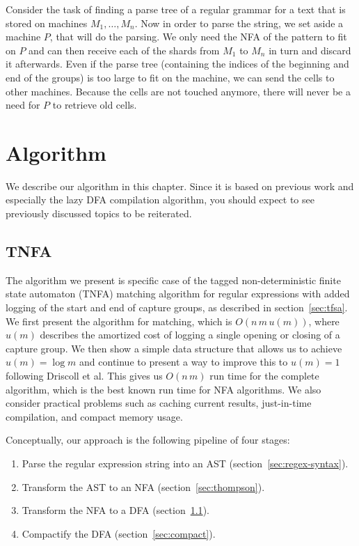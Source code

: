 \documentclass[11pt,a4paper,twoside,openright]{Thesis}
\theoremstyle{definition}
\newcommand{\Secref}[1]{section~\ref{sec:#1}}
\newcommand{\seclabel}[1]{\label{sec:#1}}
\begin{document}
Consider the task of finding a parse tree of a regular grammar for a text
that is stored on machines $M_1, \dots, M_n$. Now in order to parse the
string, we set aside a machine $P$, that will do the parsing. We only need the NFA of the
pattern to fit on $P$ and can then receive each of the shards
from $M_1$ to $M_n$ in turn and discard it afterwards. Even if the parse tree
(containing the indices of the beginning and end of the groups) is too large
to fit on the machine, we can send the cells to other machines. Because the
cells are not touched anymore, there will never be a need for $P$ to retrieve
old cells.

\chapter{Algorithm} \seclabel{algo}
We describe our algorithm in this chapter. Since it is based on previous
work and especially the lazy DFA compilation algorithm, you should expect to
see previously discussed topics to be reiterated.

\section{TNFA}\label{sec:tnfa}

The algorithm we present is specific case of the tagged non-deterministic
finite state automaton (TNFA) matching algorithm for regular expressions with
added logging of the start and end of capture groups, as described in
\Secref{tfsa}. We first present the algorithm for matching, which is $O(n\, m\,
u(m))$, where $u(m)$ describes the amortized cost of logging a single opening
or closing of a capture group. We then show a
simple data structure that allows us to achieve $u(m) = \log m$ and
continue to present a way to improve this to $u(m) = 1$ following Driscoll et
al\cite{Dris89a}. This gives us $O(n\, m)$ run time for the
complete algorithm, which is the best known run time for NFA algorithms. We 
also consider practical problems such as caching current results, just-in-time
compilation, and compact memory usage.

Conceptually, our approach is the following pipeline of four stages:
\begin{enumerate}
  \item Parse the regular expression string into an AST (\Secref{regex-syntax}).
  \item Transform the AST to an NFA (\Secref{thompson}).
  \item Transform the NFA to a DFA (\Secref{tnfa}).
  \item Compactify the DFA (\Secref{compact}).
\end{enumerate}
\end{document}
